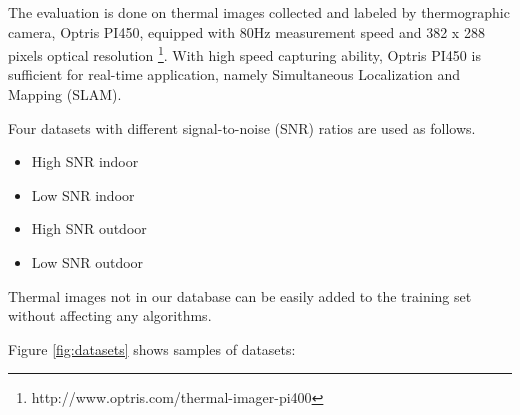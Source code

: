 The evaluation is done on thermal images
collected and labeled by thermographic camera, Optris PI450, equipped with 80Hz
measurement speed and 382 x 288 pixels optical resolution \footnote{http://www.optris.com/thermal-imager-pi400}. With high speed capturing ability, Optris PI450 is sufficient for real-time application, namely Simultaneous Localization and Mapping (SLAM).   

Four datasets with different signal-to-noise (SNR) ratios  are used as follows. 
\begin{itemize}
\item High SNR indoor
\item Low SNR indoor 
\item High SNR outdoor
\item Low SNR outdoor 
\end{itemize}

Thermal images not in our database can be easily added to the training set without affecting any algorithms.











Figure \ref{fig:datasets} shows samples of datasets:

